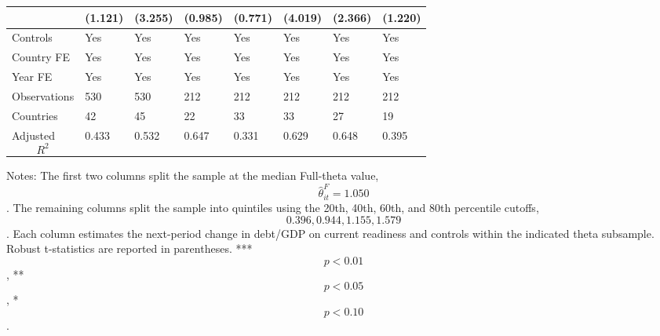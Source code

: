 \begin{table}[H]
\begin{threeparttable}
\begin{tabularx}{\textwidth}{lYYYYYYY}
  & (1.121) & (3.255) & (0.985) & (0.771) & (4.019) & (2.366) & (1.220) \\
\midrule
Controls & Yes & Yes & Yes & Yes & Yes & Yes & Yes \\
Country FE & Yes & Yes & Yes & Yes & Yes & Yes & Yes \\
Year FE & Yes & Yes & Yes & Yes & Yes & Yes & Yes \\
Observations & 530 & 530 & 212 & 212 & 212 & 212 & 212 \\
Countries & 42 & 45 & 22 & 33 & 33 & 27 & 19 \\
Adjusted $$R^2$$ & 0.433 & 0.532 & 0.647 & 0.331 & 0.629 & 0.648 & 0.395 \\
\bottomrule
\end{tabularx}
\begin{tablenotes}[flushleft]\footnotesize
\item Notes: The first two columns split the sample at the median Full-theta value, $$\widehat{\theta}^{F}_{it}=1.050$$. The remaining columns split the sample into quintiles using the 20th, 40th, 60th, and 80th percentile cutoffs, $$0.396, 0.944, 1.155, 1.579$$. Each column estimates the next-period change in debt/GDP on current readiness and controls within the indicated theta subsample. Robust t-statistics are reported in parentheses. *** $$p<0.01$$, ** $$p<0.05$$, * $$p<0.10$$.
\end{tablenotes}
\end{threeparttable}
\end{table}
